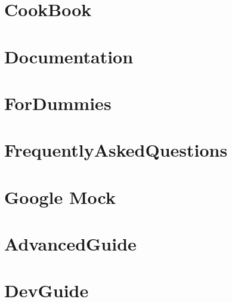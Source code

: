 \documentclass[twoside]{book}
\newcommand{\+}{\discretionary{\mbox{\scriptsize$\hookleftarrow$}}{}{}}
\begin{document}
\chapter{Cook\+Book}
\label{md_vendor_googletest_googlemock_docs_v1_7_CookBook}
\hypertarget{md_vendor_googletest_googlemock_docs_v1_7_CookBook}{}

\chapter{Documentation}
\label{md_vendor_googletest_googlemock_docs_v1_7_Documentation}
\hypertarget{md_vendor_googletest_googlemock_docs_v1_7_Documentation}{}

\chapter{For\+Dummies}
\label{md_vendor_googletest_googlemock_docs_v1_7_ForDummies}
\hypertarget{md_vendor_googletest_googlemock_docs_v1_7_ForDummies}{}

\chapter{Frequently\+Asked\+Questions}
\label{md_vendor_googletest_googlemock_docs_v1_7_FrequentlyAskedQuestions}
\hypertarget{md_vendor_googletest_googlemock_docs_v1_7_FrequentlyAskedQuestions}{}

\chapter{Google Mock}
\label{md_vendor_googletest_googlemock_README}
\hypertarget{md_vendor_googletest_googlemock_README}{}

\chapter{Advanced\+Guide}
\label{md_vendor_googletest_googletest_docs_AdvancedGuide}
\hypertarget{md_vendor_googletest_googletest_docs_AdvancedGuide}{}

\chapter{Dev\+Guide}
\label{md_vendor_googletest_googletest_docs_DevGuide}
\hypertarget{md_vendor_googletest_googletest_docs_DevGuide}{}

\end{document}
